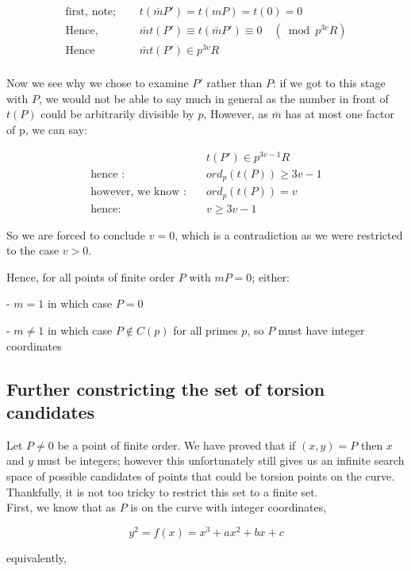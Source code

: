 \documentclass{article}
\begin{document}
\begin{align*}
    \text{first, note; } \quad & t(\bar{m}P') = t(mP) = t(0) = 0 \\
    \text{Hence, } \quad & \bar{m}t(P') \equiv t(\bar{m}P') \equiv 0 \quad (\bmod{p^{3v}R}) \\
    \text{Hence } \quad & \bar{m}t(P') \in p^{3v}R \\
\end{align*}

Now we see why we chose to examine $P'$ rather than $P$: if we got to this stage with $P$, we would not be able to say much in general as the number in front of $t(P)$ could be arbitrarily divisible by $p$, However, as $\bar{m}$ has at most one factor of p, we can say:

\begin{align*}
    & t(P') \in p^{3v-1}R\\
    \text{hence :} \quad & ord_p(t(P)) \geq 3v - 1 \\
    \text{however, we know :} \quad & ord_p(t(P)) = v\\
    \text{hence: } \quad & v \geq 3v - 1
\end{align*}

So we are forced to conclude $v = 0$, which is a contradiction as we were restricted to the case $v > 0$.

Hence, for all points of finite order $P$ with $mP = 0$; either:

- $m = 1$ in which case $P = 0$

- $m \neq 1$ in which case $P \notin C(p)$ for all primes $p$, so $P$ must have integer coordinates

\subsection{Further constricting the set of torsion candidates}

Let $P \neq 0$ be a point of finite order. We have proved that if $(x, y) = P$ then $x$ and $y$ must be integers; however this unfortunately still gives us an infinite search space of possible candidates of points that could be torsion points on the curve. Thankfully, it is not too tricky to restrict this set to a finite set.\\

First, we know that as $P$ is on the curve with integer coordinates, 

\[ y^2 = f(x) = x^3 + a x^2 + b x + c \]

equivalently,
\end{document}
